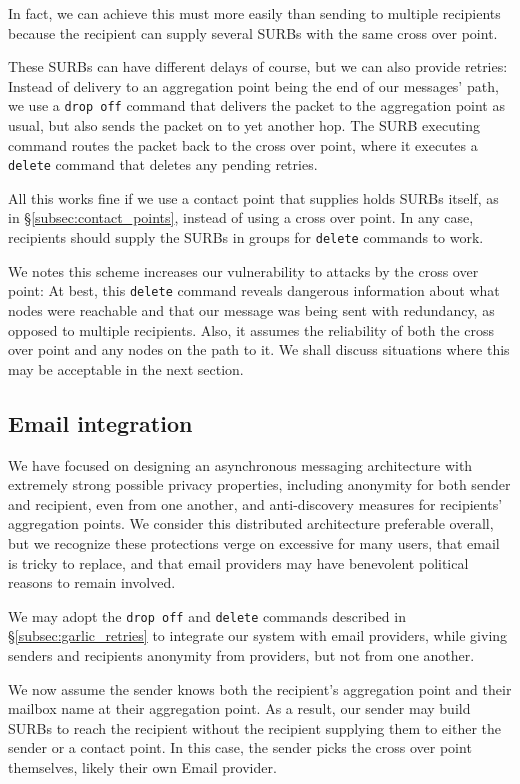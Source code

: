 In fact, we can achieve this must more easily than sending to
multiple recipients because the recipient can supply several SURBs
with the same cross over point.

These SURBs can have different delays of course, but we can also
provide retries:  Instead of delivery to an aggregation point being
the end of our messages' path, we use a {\tt drop off} command that
delivers the packet to the aggregation point as usual, but also
sends the packet on to yet another hop.  The SURB executing command
routes the packet back to the cross over point, where it executes a
{\tt delete} command that deletes any pending retries.

All this works fine if we use a contact point that supplies holds
SURBs itself, as in \S\ref{subsec:contact_points}, instead of using
a cross over point.  In any case, recipients should supply the SURBs
in groups for {\tt delete} commands to work.

We notes this scheme increases our vulnerability to attacks by the
cross over point:  At best, this {\tt delete} command reveals
dangerous information about what nodes were reachable and that our
message was being sent with redundancy, as opposed to multiple 
recipients.  Also, it assumes the reliability of both the cross over
point and any nodes on the path to it.
%
We shall discuss situations where this may be acceptable in the next section.


\subsection{Email integration}\label{subsec:LEAP}

We have focused on designing an asynchronous messaging architecture
with extremely strong possible privacy properties, including
anonymity for both sender and recipient, even from one another, and
anti-discovery measures for recipients' aggregation points.  
%
We consider this distributed architecture preferable overall, but
we recognize these protections verge on excessive for many users,
that email is tricky to replace, and that email providers may have
benevolent political reasons to remain involved.

We may adopt the {\tt drop off} and {\tt delete} commands described
in \S\ref{subsec:garlic_retries} to integrate our system with email
providers, while giving senders and recipients anonymity from
providers, but not from one another.

We now assume the sender knows both the recipient's aggregation point
and their mailbox name at their aggregation point.  As a result, our
sender may build SURBs to reach the recipient without the recipient
supplying them to either the sender or a contact point.  
In this case, the sender picks the cross over point themselves, 
likely their own Email provider.

